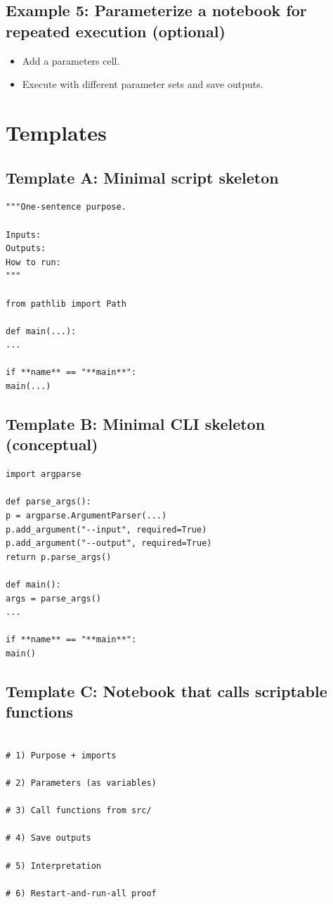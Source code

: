 \subsection{Example 5: Parameterize a notebook for repeated execution (optional)}
\begin{itemize}
\item Add a parameters cell.
\item Execute with different parameter sets and save outputs.
\end{itemize}

\section{Templates}
\subsection{Template A: Minimal script skeleton}
\begin{verbatim}
"""One-sentence purpose.

Inputs:
Outputs:
How to run:
"""

from pathlib import Path

def main(...):
...

if **name** == "**main**":
main(...)
\end{verbatim}

\subsection{Template B: Minimal CLI skeleton (conceptual)}
\begin{verbatim}
import argparse

def parse_args():
p = argparse.ArgumentParser(...)
p.add_argument("--input", required=True)
p.add_argument("--output", required=True)
return p.parse_args()

def main():
args = parse_args()
...

if **name** == "**main**":
main()
\end{verbatim}

\subsection{Template C: Notebook that calls scriptable functions}
\begin{verbatim}

# 1) Purpose + imports

# 2) Parameters (as variables)

# 3) Call functions from src/

# 4) Save outputs

# 5) Interpretation

# 6) Restart-and-run-all proof

\end{verbatim}

